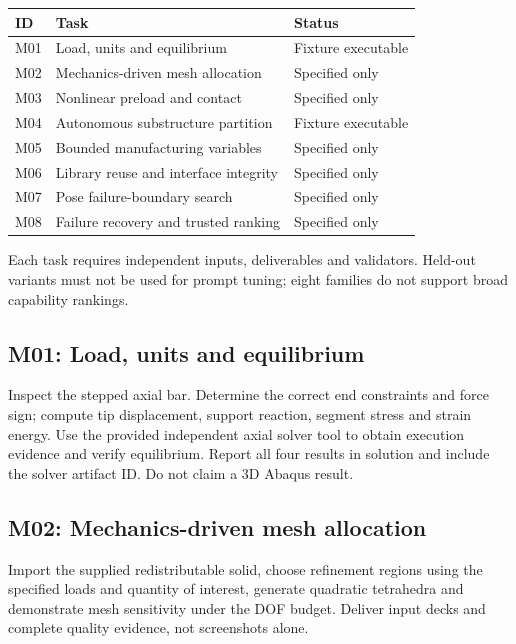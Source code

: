 \documentclass[UTF8,a4paper,11pt,fontset=windows]{ctexart}
\begin{document}
\noindent\begin{tabularx}{\linewidth}{@{}l X l@{}}\toprule ID & Task & Status \\\midrule

M01 & Load, units and equilibrium & Fixture executable \\

M02 & Mechanics-driven mesh allocation & Specified only \\

M03 & Nonlinear preload and contact & Specified only \\

M04 & Autonomous substructure partition & Fixture executable \\

M05 & Bounded manufacturing variables & Specified only \\

M06 & Library reuse and interface integrity & Specified only \\

M07 & Pose failure-boundary search & Specified only \\

M08 & Failure recovery and trusted ranking & Specified only \\

\bottomrule\end{tabularx}

Each task requires independent inputs, deliverables and validators. Held-out variants must not be used for prompt tuning; eight families do not support broad capability rankings.

\subsection{M01: Load, units and equilibrium}

Inspect the stepped axial bar. Determine the correct end constraints and force sign; compute tip displacement, support reaction, segment stress and strain energy. Use the provided independent axial solver tool to obtain execution evidence and verify equilibrium. Report all four results in solution and include the solver artifact ID. Do not claim a 3D Abaqus result.

\subsection{M02: Mechanics-driven mesh allocation}

Import the supplied redistributable solid, choose refinement regions using the specified loads and quantity of interest, generate quadratic tetrahedra and demonstrate mesh sensitivity under the DOF budget. Deliver input decks and complete quality evidence, not screenshots alone.
\end{document}
